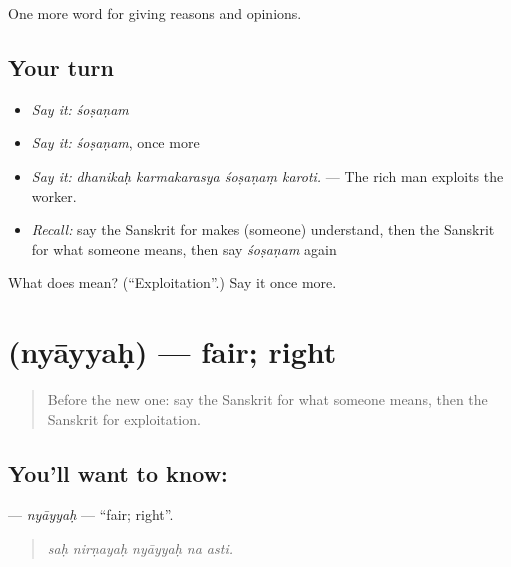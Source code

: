 \begin{grammarlens}[title={What you've built}]
One more word for giving reasons and opinions.
\end{grammarlens}

\subsection*{Your turn}
\begin{itemize}
\raggedright
  \item \emph{Say it:} \emph{śoṣaṇam}
  \item \emph{Say it:} \emph{śoṣaṇam}, once more
  \item \emph{Say it:} \emph{dhanikaḥ karmakarasya śoṣaṇaṃ karoti.} — The rich man exploits the worker.
  \item \emph{Recall:} say the Sanskrit for makes (someone) understand, then the Sanskrit for what someone means, then say \emph{śoṣaṇam} again
\end{itemize}

\begin{tcolorbox}[breakable,colback=teal!4,colframe=teal!35!black,title={Before you move on}]
What does  mean? (\textquotedblleft{}Exploitation\textquotedblright{}.) Say it once more.
\end{tcolorbox}
\section[\texorpdfstring{\sk{न्याय्यः} (nyāyyaḥ)}{न्याय्यः (nyāyyaḥ)}]{ (nyāyyaḥ) — fair; right}

\label{lesson:SA-C348-nyayyah}



\begin{quote}
Before the new one: say the Sanskrit for what someone means, then the Sanskrit for exploitation.
\end{quote}

\subsection*{You'll want to know: }
\textbf{} — \emph{nyāyyaḥ} — \textquotedblleft{}fair; right\textquotedblright{}.

\begin{quote}
    
\end{quote}

\begin{quote}
\emph{saḥ nirṇayaḥ nyāyyaḥ na asti.}
\end{quote}

